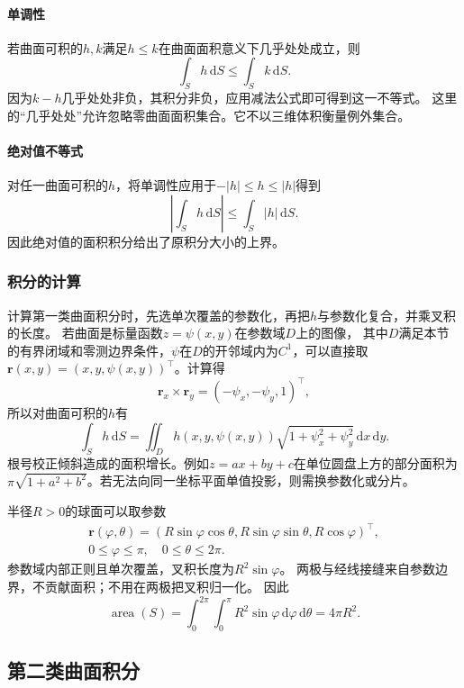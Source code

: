 \paragraph{单调性}

若曲面可积的$h,k$满足$h\leq k$在曲面面积意义下几乎处处成立，则
\[
 \int_Sh\,\mathrm dS\leq\int_Sk\,\mathrm dS.
\]
因为$k-h$几乎处处非负，其积分非负，应用减法公式即可得到这一不等式。
这里的“几乎处处”允许忽略零曲面面积集合。它不以三维体积衡量例外集合。

\paragraph{绝对值不等式}

对任一曲面可积的$h$，将单调性应用于$-|h|\leq h\leq|h|$得到
\[
 \left|\int_Sh\,\mathrm dS\right|\leq\int_S|h|\,\mathrm dS.
\]
因此绝对值的面积积分给出了原积分大小的上界。

\subsubsection{积分的计算}

计算第一类曲面积分时，先选单次覆盖的参数化，再把$h$与参数化复合，并乘叉积的长度。
若曲面是标量函数$z=\psi(x,y)$在参数域$D$上的图像，
其中$D$满足本节的有界闭域和零测边界条件，$\psi$在$D$的开邻域内为$C^1$，可以直接取
$\bm r(x,y)=(x,y,\psi(x,y))^\top$。计算得
\[
 \bm r_x\times\bm r_y=(-\psi_x,-\psi_y,1)^\top,
\]
所以对曲面可积的$h$有
\[
 \int_Sh\,\mathrm dS
 =\iint_Dh(x,y,\psi(x,y))\sqrt{1+\psi_x^2+\psi_y^2}\,\mathrm dx\,\mathrm dy.
\]
根号校正倾斜造成的面积增长。例如$z=ax+by+c$在单位圆盘上方的部分面积为
$\pi\sqrt{1+a^2+b^2}$。若无法向同一坐标平面单值投影，则需换参数化或分片。

半径$R>0$的球面可以取参数
\[
 \begin{gathered}
 \bm r(\varphi,\theta)
 =(R\sin\varphi\cos\theta,R\sin\varphi\sin\theta,R\cos\varphi)^\top,\\
 0\leq\varphi\leq\pi,\quad 0\leq\theta\leq2\pi.
 \end{gathered}
\]
参数域内部正则且单次覆盖，叉积长度为$R^2\sin\varphi$。
两极与经线接缝来自参数边界，不贡献面积；不用在两极把叉积归一化。
因此
\[
 \operatorname{area}(S)
 =\int_0^{2\pi}\int_0^\pi R^2\sin\varphi\,\mathrm d\varphi\,\mathrm d\theta
 =4\pi R^2.
\]

\subsection{第二类曲面积分}

